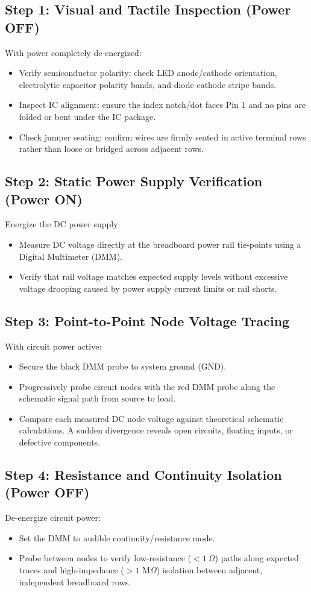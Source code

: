 \subsection{Step 1: Visual and Tactile Inspection (Power OFF)}
With power completely de-energized:
\begin{itemize}[leftmargin=1.5em]
    \item Verify semiconductor polarity: check LED anode/cathode orientation, electrolytic capacitor polarity bands, and diode cathode stripe bands.
    \item Inspect IC alignment: ensure the index notch/dot faces Pin 1 and no pins are folded or bent under the IC package.
    \item Check jumper seating: confirm wires are firmly seated in active terminal rows rather than loose or bridged across adjacent rows.
\end{itemize}

\subsection{Step 2: Static Power Supply Verification (Power ON)}
Energize the DC power supply:
\begin{itemize}[leftmargin=1.5em]
    \item Measure DC voltage directly at the breadboard power rail tie-points using a Digital Multimeter (DMM).
    \item Verify that rail voltage matches expected supply levels without excessive voltage drooping caused by power supply current limits or rail shorts.
\end{itemize}

\subsection{Step 3: Point-to-Point Node Voltage Tracing}
With circuit power active:
\begin{itemize}[leftmargin=1.5em]
    \item Secure the black DMM probe to system ground (GND).
    \item Progressively probe circuit nodes with the red DMM probe along the schematic signal path from source to load.
    \item Compare each measured DC node voltage against theoretical schematic calculations. A sudden divergence reveals open circuits, floating inputs, or defective components.
\end{itemize}

\subsection{Step 4: Resistance and Continuity Isolation (Power OFF)}
De-energize circuit power:
\begin{itemize}[leftmargin=1.5em]
    \item Set the DMM to audible continuity/resistance mode.
    \item Probe between nodes to verify low-resistance ($<1\ \Omega$) paths along expected traces and high-impedance ($>1\text{ M}\Omega$) isolation between adjacent, independent breadboard rows.
\end{itemize}
